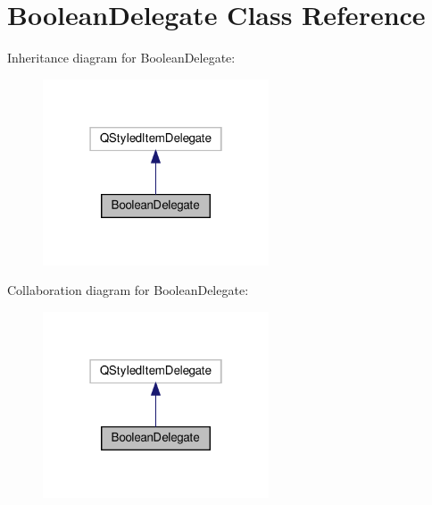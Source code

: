 \hypertarget{class_boolean_delegate}{}\section{Boolean\+Delegate Class Reference}
\label{class_boolean_delegate}


Inheritance diagram for Boolean\+Delegate\+:\nopagebreak
\begin{figure}[H]
\begin{center}
\leavevmode
\includegraphics[width=190pt]{class_boolean_delegate__inherit__graph}
\end{center}
\end{figure}


Collaboration diagram for Boolean\+Delegate\+:\nopagebreak
\begin{figure}[H]
\begin{center}
\leavevmode
\includegraphics[width=190pt]{class_boolean_delegate__coll__graph}
\end{center}
\end{figure}
